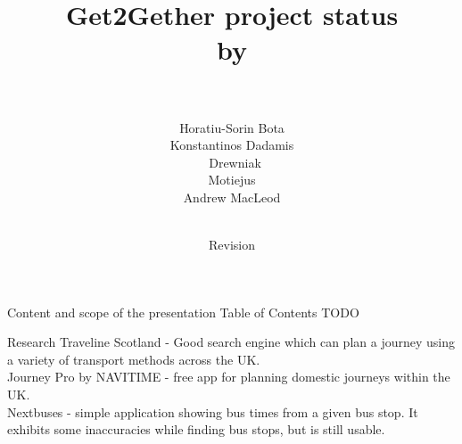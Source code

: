 \documentclass{beamer}
\title[get2gether]{Get2Gether project status\\ by\\\dnd\ }
\author{Horatiu-Sorin Bota \\
		Konstantinos Dadamis \\
		\pawel\ Drewniak \\
		Motiejus \jakstys \\
		Andrew MacLeod}
\date{\GITAuthorDate\\
Revision \GITAbrHash
}
\begin{document}
\begin{frame}
\titlepage
\end{frame}

\begin{frame}{Content and scope of the presentation}
Table of Contents TODO
\end{frame}

\begin{frame}{Research}
Traveline Scotland - Good search engine which can plan a journey using a variety of transport methods across the UK. \\
Journey Pro by NAVITIME - free app for planning domestic journeys within the UK. \\
Nextbuses - simple application showing bus times from a given bus stop. It exhibits some inaccuracies while finding bus stops, but is still usable. \\
\end{frame}
\end{document}
